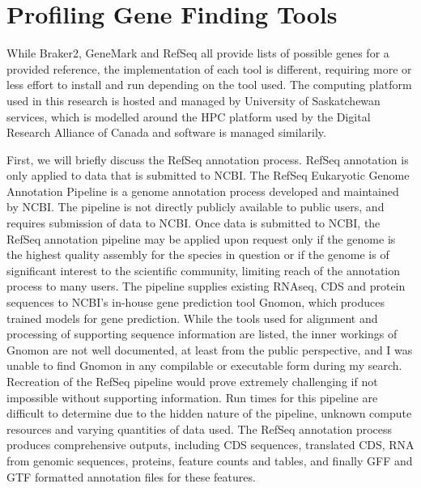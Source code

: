 \section{Profiling Gene Finding Tools}

While Braker2, GeneMark and RefSeq all provide lists of possible genes
for a provided reference, the implementation of each tool is
different, requiring more or less effort to install and run depending
on the tool used. The computing platform used in this research is
hosted and managed by University of Saskatchewan services, which is
modelled around the HPC platform used by the Digital Research Alliance
of Canada and software is managed similarily. 

First, we will briefly discuss the RefSeq annotation process. RefSeq
annotation is only applied to data that is submitted to NCBI. The
RefSeq Eukaryotic Genome Annotation Pipeline\cite{NCBI2024} is a
genome annotation process developed and maintained by NCBI. The
pipeline is not directly publicly available to public users, and
requires submission of data to NCBI. Once data is submitted to NCBI,
the RefSeq annotation pipeline may be applied upon request only if the
genome is the highest quality assembly for the species in question or
if the genome is of significant interest to the scientific community,
limiting reach of the annotation process to many users. The pipeline
supplies existing RNAseq, CDS and protein sequences to NCBI's in-house
gene prediction tool Gnomon, which produces trained models for gene
prediction. While the tools used for alignment and processing of
supporting sequence information are listed, the inner workings of
Gnomon are not well documented, at least from the public perspective,
and I was unable to find Gnomon in any compilable or executable form
during my search. Recreation of the RefSeq pipeline would prove
extremely challenging if not impossible without supporting
information. Run times for this pipeline are difficult to determine
due to the hidden nature of the pipeline, unknown compute resources
and varying quantities of data used. The RefSeq annotation process
produces comprehensive outputs, including CDS sequences, translated
CDS, RNA from genomic sequences, proteins, feature counts and tables,
and finally GFF and GTF formatted annotation files for these features.

